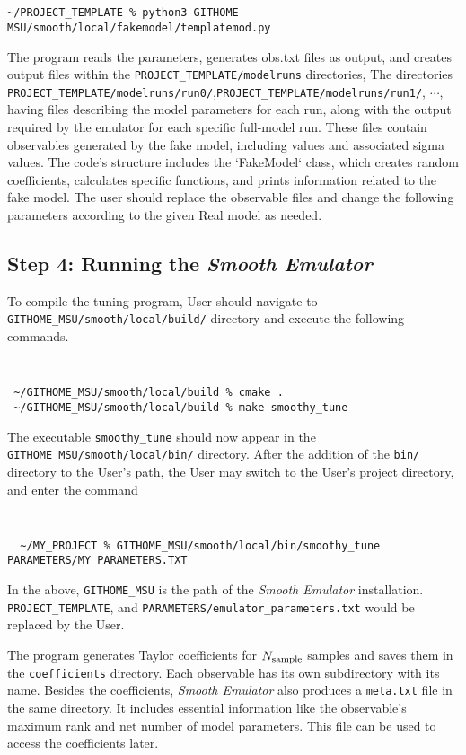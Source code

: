 \documentclass[UserManual.tex]{subfiles}
\begin{document}
\
\vspace{-20pt}
{\tt
\begin{verbatim}
~/PROJECT_TEMPLATE % python3 GITHOME MSU/smooth/local/fakemodel/templatemod.py
\end{verbatim}
}
The program reads the parameters, generates obs.txt files as output, and creates output files within the {\tt PROJECT\_TEMPLATE/modelruns} directories, The directories
{\tt  PROJECT\_TEMPLATE/modelruns/run0/},{\tt  PROJECT\_TEMPLATE/modelruns/run1/}, $\cdots$, having files describing the model parameters for each run, along with the output required by the emulator for each specific full-model run. These files contain observables generated by the fake model, including values and associated sigma values. The code's structure includes the `FakeModel` class, which creates random coefficients, calculates specific functions, and prints information related to the fake model. The user should replace the observable files and change the following parameters according to the given Real model as needed.


\subsection{Step 4: Running the {\it Smooth Emulator}}
To compile the tuning program, User should navigate to {\tt GITHOME\_MSU/smooth/local/build/} directory and execute the following commands.
{\tt
\begin{verbatim}
 ~/GITHOME_MSU/smooth/local/build % cmake .
 ~/GITHOME_MSU/smooth/local/build % make smoothy_tune
\end{verbatim}
}
The executable {\tt smoothy\_tune} should now appear in the {\tt GITHOME\_MSU/smooth/local/bin/} directory. After the addition of the {\tt bin/} directory to the User's path, the User may switch to the User's project directory, and enter the command
{\tt
\begin{verbatim}
  ~/MY_PROJECT % GITHOME_MSU/smooth/local/bin/smoothy_tune PARAMETERS/MY_PARAMETERS.TXT
\end{verbatim}
}
In the above, {\tt GITHOME\_MSU} is the path of the {\it Smooth Emulator} installation. {\tt PROJECT\_TEMPLATE}, and {\tt PARAMETERS/emulator\_parameters.txt} would be replaced by the User.

The program generates Taylor coefficients for $N_{\rm sample}$ samples and saves them in the {\tt coefficients} directory. Each observable has its own subdirectory with its name. Besides the coefficients, {\it Smooth Emulator} also produces a {\tt meta.txt} file in the same directory. It includes essential information like the observable's maximum rank and net number of model parameters. This file can be used to access the coefficients later.
\end{document}
